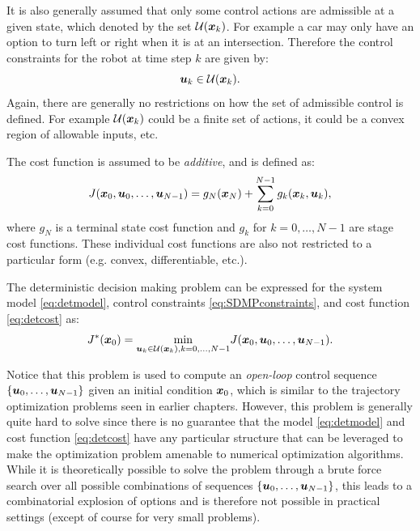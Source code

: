 It is also generally assumed that only some control actions are admissible at a given state, which denoted by the set $\mathcal{U}(\bm{x}_k)$. For example a car may only have an option to turn left or right when it is at an intersection.
Therefore the control constraints for the robot at time step $k$ are given by:
\begin{equation} \label{eq:SDMPconstraints}
\bm{u}_k \in \mathcal{U}(\bm{x}_k).
\end{equation}
Again, there are generally no restrictions on how the set of admissible control is defined. For example $\mathcal{U}(\bm{x}_k)$ could be a finite set of actions, it could be a convex region of allowable inputs, etc.

The cost function is assumed to be \textit{additive}, and is defined as:
\begin{equation} \label{eq:detcost}
J(\bm{x}_0, \bm{u}_0, \dots, \bm{u}_{N-1}) = g_N(\bm{x}_N) + \sum_{k=0}^{N-1} g_k(\bm{x}_k, \bm{u}_k),
\end{equation}
where $g_N$ is a terminal state cost function and $g_k$ for $k=0,\dots,N-1$ are stage cost functions. These individual cost functions are also not restricted to a particular form (e.g. convex, differentiable, etc.).

\begin{definition}
The deterministic decision making problem can be expressed for the system model \eqref{eq:detmodel}, control constraints \eqref{eq:SDMPconstraints}, and cost function \eqref{eq:detcost} as:
\begin{equation} \label{eq:dproblem}
J^*(\bm{x}_0) = \underset{\bm{u}_k \in \mathcal{U}(\bm{x}_k), k=0,\dots,N-1}{\min} J(\bm{x}_0, \bm{u}_0, \dots, \bm{u}_{N-1}).
\end{equation}
\end{definition}

Notice that this problem is used to compute an \textit{open-loop} control sequence $\{\bm{u}_0, \dots, \bm{u}_{N-1}\}$ given an initial condition $\bm{x}_0$, which is similar to the trajectory optimization problems seen in earlier chapters. However, this problem is generally quite hard to solve since there is no guarantee that the model \eqref{eq:detmodel} and cost function \eqref{eq:detcost} have any particular structure that can be leveraged to make the optimization problem amenable to numerical optimization algorithms. While it is theoretically possible to solve the problem through a brute force search over all possible combinations of sequences $\{\bm{u}_0, \dots, \bm{u}_{N-1}\}$, this leads to a combinatorial explosion of options and is therefore not possible in practical settings (except of course for very small problems).

